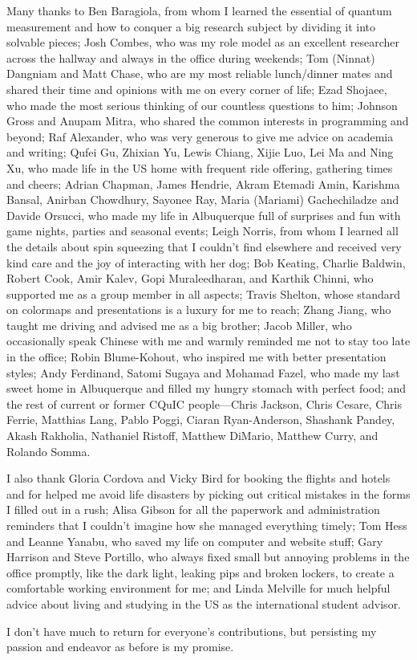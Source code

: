 \begin{acknowledgments}
Many thanks to Ben Baragiola, from whom I learned the essential of quantum measurement and how to conquer a big research subject by dividing it into solvable pieces; Josh Combes, who was my role model as an excellent researcher across the hallway and always in the office during weekends; Tom (Ninnat) Dangniam and Matt Chase, who are my most reliable lunch/dinner mates and shared their time and opinions with me on every corner of life; Ezad Shojaee, who made the most serious thinking of our countless questions to him; Johnson Gross and Anupam Mitra, who shared the common interests in programming and beyond; Raf Alexander, who was very generous to give me advice on academia and writing; Qufei Gu, Zhixian Yu, Lewis Chiang, Xijie Luo, Lei Ma and Ning Xu, who made life in the US home with frequent ride offering, gathering times and cheers; Adrian Chapman, James Hendrie, Akram Etemadi Amin, Karishma Bansal, Anirban Chowdhury, Sayonee Ray, Maria (Mariami) Gachechiladze and Davide Orsucci, who made my life in Albuquerque full of surprises and fun with game nights, parties and seasonal events; Leigh Norris, from whom I learned all the details about spin squeezing that I couldn't find elsewhere and received very kind care and the joy of interacting with her dog; Bob Keating, Charlie Baldwin, Robert Cook, Amir Kalev, Gopi Muraleedharan, and Karthik Chinni, who supported me as a group member in all aspects; Travis Shelton, whose standard on colormaps and presentations is a luxury for me to reach; Zhang Jiang, who taught me driving and advised me as a big brother; Jacob Miller, who occasionally speak Chinese with me and warmly reminded me not to stay too late in the office; Robin Blume-Kohout, who inspired me with better presentation styles; Andy Ferdinand, Satomi Sugaya and Mohamad Fazel, who made my last sweet home in Albuquerque and filled my hungry stomach with perfect food; and the rest of current or former CQuIC people---Chris Jackson, Chris Cesare, Chris Ferrie, Matthias Lang, Pablo Poggi, Ciaran Ryan-Anderson, Shashank Pandey, Akash Rakholia, Nathaniel Ristoff, Matthew DiMario, Matthew Curry, and Rolando Somma.

I also thank Gloria Cordova and Vicky Bird for booking the flights and hotels and for helped me avoid life disasters by picking out critical mistakes in the forms I filled out in a rush; Alisa Gibson for all the paperwork and administration reminders that I couldn't imagine how she managed everything timely; Tom Hess and Leanne Yanabu, who saved my life on computer and website stuff; Gary Harrison and Steve Portillo, who always fixed small but annoying problems in the office promptly, like the dark light, leaking pips and broken lockers, to create a comfortable working environment for me; and Linda Melville for much helpful advice about living and studying in the \hbox{US} as the international student advisor.

I don't have much to return for everyone's contributions, but persisting my passion and endeavor as before is my promise.
\end{acknowledgments} 
